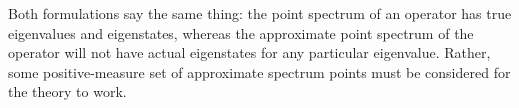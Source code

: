 Both formulations say the same thing: the point spectrum of an operator has true
eigenvalues and eigenstates, whereas the approximate point spectrum of the
operator will not have actual eigenstates for any particular eigenvalue. Rather,
some positive-measure set of approximate spectrum points must be considered for
the theory to work.

